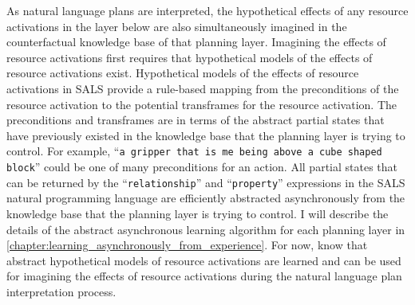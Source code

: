 As natural language plans are interpreted, the hypothetical effects of
any resource activations in the layer below are also simultaneously
imagined in the counterfactual knowledge base of that planning layer.
Imagining the effects of resource activations first requires that
hypothetical models of the effects of resource activations exist.
Hypothetical models of the effects of resource activations in SALS
provide a rule-based mapping from the preconditions of the resource
activation to the potential transframes for the resource activation.
The preconditions and transframes are in terms of the abstract partial
states that have previously existed in the knowledge base that the
planning layer is trying to control.  For example, ``{\tt{a gripper
    that is me being above a cube shaped block}}'' could be one of
many preconditions for an action.  All partial states that can be
returned by the ``{\tt{relationship}}'' and ``{\tt{property}}''
expressions in the SALS natural programming language are efficiently
abstracted asynchronously from the knowledge base that the planning
layer is trying to control.  I will describe the details of the
abstract asynchronous learning algorithm for each planning layer in
{\mbox{\autoref{chapter:learning_asynchronously_from_experience}}}.
For now, know that abstract hypothetical models of resource
activations are learned and can be used for imagining the effects of
resource activations during the natural language plan interpretation
process.

